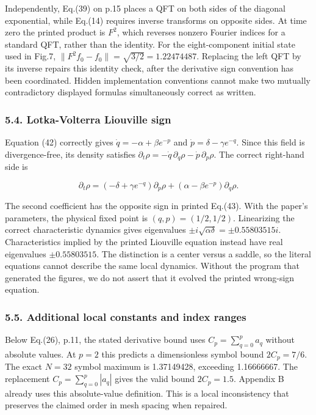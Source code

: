 Independently, Eq.(39) on p.15 places a QFT on both sides of the
diagonal exponential, while Eq.(14) requires inverse transforms on
opposite sides. At time zero the printed product is \(F^2\), which
reverses nonzero Fourier indices for a standard QFT, rather than the
identity. For the eight-component initial state used in Fig.7,
\(\|F^2f_0-f_0\|=\sqrt{3/2}=1.22474487\). Replacing the left QFT by its
inverse repairs this identity check, after the derivative sign
convention has been coordinated. Hidden implementation conventions
cannot make two mutually contradictory displayed formulas simultaneously
correct as written.

\subsubsection{5.4. Lotka-Volterra Liouville
sign}\label{lotka-volterra-liouville-sign}

Equation (42) correctly gives \(\dot q=-\alpha+\beta e^{-p}\) and
\(\dot p=\delta-\gamma e^{-q}\). Since this field is divergence-free,
its density satisfies
\(\partial_t\rho=-\dot q\,\partial_q\rho-\dot p\,\partial_p\rho\). The
correct right-hand side is

\[
\partial_t\rho=(-\delta+\gamma e^{-q})\partial_p\rho
+(\alpha-\beta e^{-p})\partial_q\rho. \tag{16}
\]

The second coefficient has the opposite sign in printed Eq.(43). With
the paper's parameters, the physical fixed point is \((q,p)=(1/2,1/2)\).
Linearizing the correct characteristic dynamics gives eigenvalues
\(\pm i\sqrt{\alpha\delta}=\pm0.55803515i\). Characteristics implied by
the printed Liouville equation instead have real eigenvalues
\(\pm0.55803515\). The distinction is a center versus a saddle, so the
literal equations cannot describe the same local dynamics. Without the
program that generated the figures, we do not assert that it evolved the
printed wrong-sign equation.

\subsubsection{5.5. Additional local constants and index
ranges}\label{additional-local-constants-and-index-ranges}

Below Eq.(26), p.11, the stated derivative bound uses
\(C_p=\sum_{q=0}^p a_q\) without absolute values. At \(p=2\) this
predicts a dimensionless symbol bound \(2C_p=7/6\). The exact \(N=32\)
symbol maximum is 1.37149428, exceeding 1.16666667. The replacement
\(C_p=\sum_{q=0}^p|a_q|\) gives the valid bound \(2C_p=1.5\). Appendix B
already uses this absolute-value definition. This is a local
inconsistency that preserves the claimed order in mesh spacing when
repaired.

